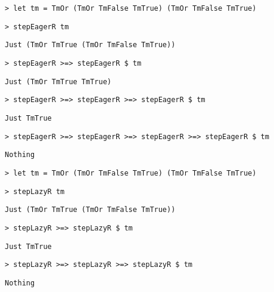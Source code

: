 \begin{frame}[fragile]
  \onslide<+->
  \begin{verbatim}
> let tm = TmOr (TmOr TmFalse TmTrue) (TmOr TmFalse TmTrue)
  \end{verbatim}
  \onslide<+->
  \begin{verbatim}
> stepEagerR tm
  \end{verbatim}
  \onslide<+->
  \begin{verbatim}
Just (TmOr TmTrue (TmOr TmFalse TmTrue))
  \end{verbatim}
  \onslide<+->
  \begin{verbatim}
> stepEagerR >=> stepEagerR $ tm
  \end{verbatim}
  \onslide<+->
  \begin{verbatim}
Just (TmOr TmTrue TmTrue)
  \end{verbatim}
  \onslide<+->
  \begin{verbatim}
> stepEagerR >=> stepEagerR >=> stepEagerR $ tm
  \end{verbatim}
  \onslide<+->
  \begin{verbatim}
Just TmTrue
  \end{verbatim}
  \onslide<+->
  \begin{verbatim}
> stepEagerR >=> stepEagerR >=> stepEagerR >=> stepEagerR $ tm
  \end{verbatim}
  \onslide<+->
  \begin{verbatim}
Nothing
  \end{verbatim}
\end{frame}

\begin{frame}[fragile]
  \onslide<+->
  \begin{verbatim}
> let tm = TmOr (TmOr TmFalse TmTrue) (TmOr TmFalse TmTrue)
  \end{verbatim}
  \onslide<+->
  \begin{verbatim}
> stepLazyR tm
  \end{verbatim}
  \onslide<+->
  \begin{verbatim}
Just (TmOr TmTrue (TmOr TmFalse TmTrue))
  \end{verbatim}
  \onslide<+->
  \begin{verbatim}
> stepLazyR >=> stepLazyR $ tm
  \end{verbatim}
  \onslide<+->
  \begin{verbatim}
Just TmTrue
  \end{verbatim}
  \onslide<+->
  \begin{verbatim}
> stepLazyR >=> stepLazyR >=> stepLazyR $ tm
  \end{verbatim}
  \onslide<+->
  \begin{verbatim}
Nothing
  \end{verbatim}
\end{frame}
